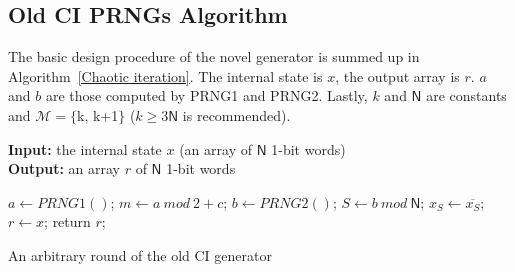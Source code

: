 \subsection{Old CI PRNGs Algorithm}
The basic design procedure of the novel generator is summed up in Algorithm~\ref{Chaotic iteration}.
The internal state is $x$, the output array is $r$. $a$ and $b$ are those computed by PRNG1 and PRNG2. Lastly, $k$ and $\mathsf{N}$ are constants and \linebreak $\mathcal{M}=\{$k, k+1$\}$ ($k\geqslant 3\mathsf{N}$ is recommended).

\begin{algorithm}
\textbf{Input:} the internal state $x$ (an array of $\mathsf{N}$ 1-bit words)\\
\textbf{Output:} an array $r$ of $\mathsf{N}$ 1-bit words
\begin{algorithmic}[1]

\STATE$a\leftarrow{PRNG1()}$;
\STATE$m\leftarrow{a~mod~2+c}$;
\STATE$b\leftarrow{PRNG2()}$;
\STATE$S\leftarrow{b~mod~\mathsf{N}}$;
\STATE$x_S\leftarrow{ \overline{x_S}}$;
\ENDWHILE
\STATE$r\leftarrow{x}$;
\STATE return $r$;
\medskip
\caption{An arbitrary round of the old CI generator}
\label{Chaotic iteration}
\end{algorithmic}
\end{algorithm}

